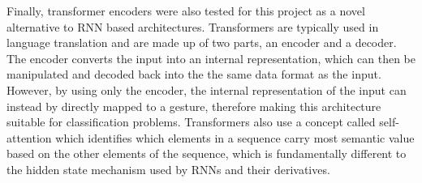 Finally, transformer encoders were also tested for this project as a novel alternative to RNN based architectures.
Transformers are typically used in language translation and are made up of two parts, an encoder and a decoder.
The encoder converts the input into an internal representation, which can then be manipulated and decoded back into the the same data format as the input.
However, by using only the encoder, the internal representation of the input can instead by directly mapped to a gesture, therefore making this architecture suitable for classification problems.
Transformers also use a concept called self-attention which identifies which elements in a sequence carry most semantic value based on the other elements of the sequence, which is fundamentally different to the hidden state mechanism used by RNNs and their derivatives.
